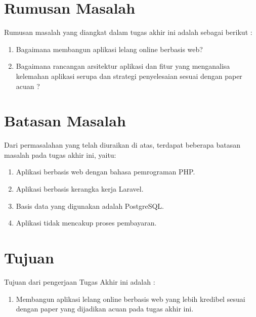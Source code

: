   \section{Rumusan Masalah}
    Rumusan masalah yang diangkat dalam tugas akhir ini adalah sebagai berikut : 
    \begin{enumerate}
      \item Bagaimana membangun aplikasi lelang online berbasis web?
      \item Bagaimana rancangan arsitektur aplikasi dan fitur yang menganalisa kelemahan aplikasi serupa dan strategi penyelesaian sesuai dengan paper acuan \cite{ying-feng_kuo_online_2016}?
    \end{enumerate}

  \section{Batasan Masalah}
  	\label{batasan-masalah}
    Dari permasalahan yang telah diuraikan di atas, terdapat beberapa batasan masalah pada tugas akhir ini, yaitu:
    \begin{enumerate}
      \item Aplikasi berbasis web dengan bahasa pemrograman PHP.
      \item Aplikasi berbasis kerangka kerja Laravel.
      \item Basis data yang digunakan adalah PostgreSQL.
      \item Aplikasi tidak mencakup proses pembayaran.
    \end{enumerate}

  \section{Tujuan}
  \label{tujuan}
    Tujuan dari pengerjaan Tugas Akhir ini adalah : 
    \begin{enumerate}
      \item Membangun aplikasi lelang online berbasis web yang lebih kredibel sesuai dengan paper yang dijadikan acuan pada tugas akhir ini. 
    \end{enumerate}